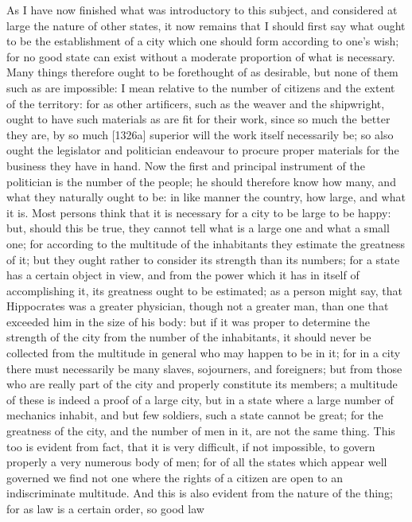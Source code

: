 As I have now finished what was introductory to this subject, and
considered at large the nature of other states, it now remains that I
should first say what ought to be the establishment of a city which one
should form according to one's wish; for no good state can exist without a
moderate proportion of what is necessary. Many things therefore ought to
be forethought of as desirable, but none of them such as are impossible: I
mean relative to the number of citizens and the extent of the territory:
for as other artificers, such as the weaver and the shipwright, ought to
have such materials as are fit for their work, since so much the better
they are, by so much [1326a] superior will the work itself necessarily be;
so also ought the legislator and politician endeavour to procure proper
materials for the business they have in hand. Now the first and principal
instrument of the politician is the number of the people; he should
therefore know how many, and what they naturally ought to be: in like
manner the country, how large, and what it is. Most persons think that it
is necessary for a city to be large to be happy: but, should this be true,
they cannot tell what is a large one and what a small one; for according
to the multitude of the inhabitants they estimate the greatness of it; but
they ought rather to consider its strength than its numbers; for a state
has a certain object in view, and from the power which it has in itself of
accomplishing it, its greatness ought to be estimated; as a person might
say, that Hippocrates was a greater physician, though not a greater man,
than one that exceeded him in the size of his body: but if it was proper
to determine the strength of the city from the number of the inhabitants,
it should never be collected from the multitude in general who may happen
to be in it; for in a city there must necessarily be many slaves,
sojourners, and foreigners; but from those who are really part of the city
and properly constitute its members; a multitude of these is indeed a
proof of a large city, but in a state where a large number of mechanics
inhabit, and but few soldiers, such a state cannot be great; for the
greatness of the city, and the number of men in it, are not the same
thing. This too is evident from fact, that it is very difficult, if not
impossible, to govern properly a very numerous body of men; for of all the
states which appear well governed we find not one where the rights of a
citizen are open to an indiscriminate multitude. And this is also evident
from the nature of the thing; for as law is a certain order, so good law
